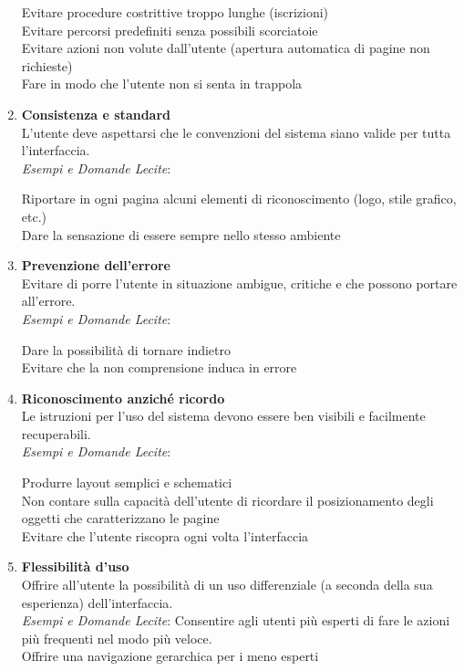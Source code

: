 \documentclass[oneside]{book}
\begin{document}
\begin{enumerate}
			Evitare procedure costrittive troppo lunghe (iscrizioni) \\
			Evitare percorsi predefiniti senza possibili scorciatoie \\
			Evitare azioni non volute dall’utente (apertura automatica di pagine non richieste) \\
			Fare in modo che l’utente non si senta in trappola \\

			\item \textbf{Consistenza e standard} \\
			L’utente deve aspettarsi che le convenzioni del sistema siano valide per tutta l’interfaccia. \\
			\emph{Esempi e Domande Lecite}: 

			Riportare in ogni pagina alcuni elementi di riconoscimento (logo, stile grafico, etc.) \\
			Dare la sensazione di essere sempre nello stesso ambiente\\

			\item \textbf{Prevenzione dell’errore} \\
			Evitare di porre l’utente in situazione ambigue, critiche e che possono portare all’errore.\\
			\emph{Esempi e Domande Lecite}: 

			Dare la possibilità di tornare indietro \\
			Evitare che la non comprensione induca in errore \\

			\item \textbf{Riconoscimento anziché ricordo} \\
			Le istruzioni per l’uso del sistema devono essere ben visibili e facilmente recuperabili.\\
			\emph{Esempi e Domande Lecite}: 


			Produrre layout semplici e schematici \\
			Non contare sulla capacità dell’utente di ricordare il posizionamento degli oggetti che caratterizzano le pagine \\
			Evitare che l’utente riscopra ogni volta l’interfaccia \\

						\item \textbf{Flessibilità d’uso} \\
			Offrire all’utente la possibilità di un uso differenziale (a seconda della sua esperienza) dell’interfaccia. \\
			\emph{Esempi e Domande Lecite}: 
			Consentire agli utenti più esperti di fare le azioni più frequenti nel modo più veloce. \\
			Offrire una navigazione gerarchica per i meno esperti \\


\end{enumerate}
\end{document}
